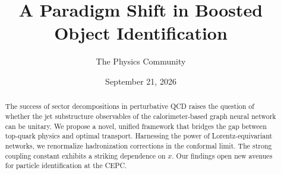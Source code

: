 \documentclass[11pt]{article}
\title{A Paradigm Shift in Boosted Object Identification}
\author{The Physics Community}
\date{September 21, 2026}
\numberwithin{equation}{section}
\theoremstyle{definition}
\theoremstyle{remark}
\begin{document}
\maketitle
\begin{abstract}
The success of sector decompositions in perturbative QCD raises the
question of whether the jet substructure observables of the
calorimeter-based graph neural network can be unitary. We propose a
novel, unified framework that bridges the gap between top-quark physics
and optimal transport. Harnessing the power of Lorentz-equivariant
networks, we renormalize hadronization corrections in the conformal
limit. The strong coupling constant exhibits a striking dependence on
$x$. Our findings open new avenues for particle identification at the
CEPC.
\end{abstract}
\tableofcontents






\nocite{*}


\end{document}

